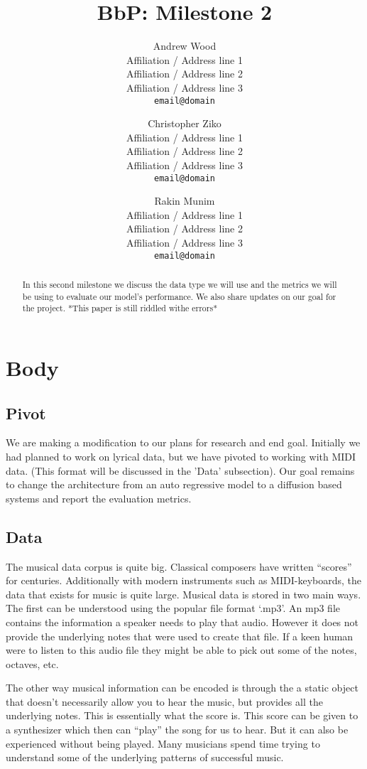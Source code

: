 \documentclass[11pt]{article}
\title{BbP: Milestone 2}
\author{
  Andrew Wood \\
  Affiliation / Address line 1 \\
  Affiliation / Address line 2 \\
  Affiliation / Address line 3 \\
  \texttt{email@domain} 
  \and
  Christopher Ziko \\
  Affiliation / Address line 1 \\
  Affiliation / Address line 2 \\
  Affiliation / Address line 3 \\
  \texttt{email@domain} 
  \and
  Rakin Munim \\
  Affiliation / Address line 1 \\
  Affiliation / Address line 2 \\
  Affiliation / Address line 3 \\
  \texttt{email@domain} 
}
\begin{document}
\maketitle
\begin{abstract}
In this second milestone we discuss the data type we will use and the metrics we will be using to evaluate our model's performance. We also share updates on our goal for the project. *This paper is still riddled withe errors*
\end{abstract}

\section{Body}

\subsection{Pivot} 
We are making a modification to our plans for research and end goal. Initially we had planned to work on lyrical data, but we have pivoted to working with MIDI data. (This format will be discussed in the 'Data' subsection). Our goal remains to change the architecture from an auto regressive model to a diffusion based systems and report the evaluation metrics. 

\subsection{Data} 
 The musical data corpus is quite big. Classical composers have written “scores” for centuries. Additionally with modern instruments such as MIDI-keyboards, the data that exists for music is quite large. Musical data is stored in two main ways. The first can be understood using the popular file format ‘.mp3’. An mp3 file contains the information a speaker needs to play that audio. However it does not provide the underlying notes that were used to create that file. If a keen human were to listen to this audio file they might be able to pick out some of the notes, octaves, etc. 

The other way musical information can be encoded is through the a static object that doesn’t necessarily allow you to hear the music, but provides all the underlying notes. This is essentially what the score is. This score can be given to a synthesizer which then can “play” the song for us to hear. But it can also be experienced without being played. Many musicians spend time trying to understand some of the underlying patterns of successful music. 
\end{document}
